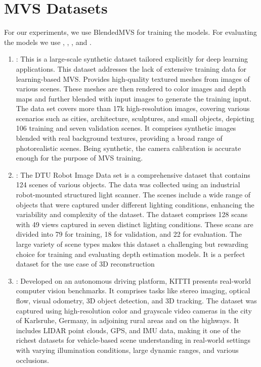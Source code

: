 


\section{MVS Datasets}\label{sec:datasets}
For our experiments, we use BlendedMVS for training the models. For evaluating the models we use {\kitti}, {\dtu}, {\scannet}, {\tanksandtemples} and {\ethd}. 
\begin{enumerate}
    \item \textbf{\blendedmvs}\cite{Yao2020}: This is a large-scale synthetic {\mvs} dataset tailored explicitly for deep learning applications. This dataset addresses the lack of extensive training data for learning-based MVS. Provides high-quality textured meshes from images of various scenes. These meshes are then rendered to color images and depth maps and further blended with input images to generate the training input. The data set covers more than 17k high-resolution images, covering various scenarios such as cities, architecture, sculptures, and small objects, depicting 106 training and seven validation scenes. It comprises synthetic images blended with real background textures, providing a broad range of photorealistic scenes. Being synthetic, the camera calibration is accurate enough for the purpose of MVS training. 
    \item \textbf{\dtu}\cite{Jensen2014, Aanaes2016}: The DTU Robot Image Data set is a comprehensive dataset that contains 124 scenes of various objects. The data was collected using an industrial robot-mounted structured light scanner. The scenes include a wide range of objects that were captured under different lighting conditions, enhancing the variability and complexity of the dataset. The dataset comprises 128 scans with 49 views captured in seven distinct lighting conditions. These scans are divided into 79 for training, 18 for validation, and 22 for evaluation. The large variety of scene types makes this dataset a challenging but rewarding choice for training and evaluating depth estimation models. It is a perfect dataset for the use case of 3D reconstruction
    \item \textbf{\kitti}\cite{Geiger2013, Uhrig2017}:  Developed on an autonomous driving platform, KITTI presents real-world computer vision benchmarks. It comprises tasks like stereo imaging, optical flow, visual odometry, 3D object detection, and 3D tracking. The dataset was captured using high-resolution color and grayscale video cameras in the city of Karlsruhe, Germany, in adjoining rural areas and on the highways. It includes LIDAR point clouds, GPS, and IMU data, making it one of the richest datasets for vehicle-based scene understanding in real-world settings with varying illumination conditions, large dynamic ranges, and various occlusions. 

\end{enumerate}
